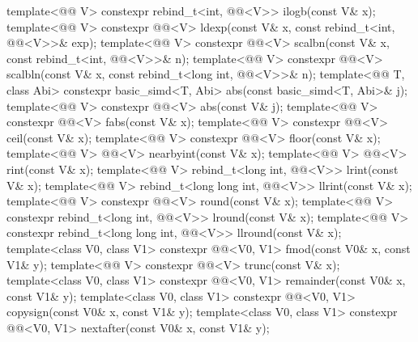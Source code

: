 \begin{itemdecl}
template<@@ V>
  constexpr rebind_t<int, @@<V>> ilogb(const V& x);
template<@@ V>
  constexpr @@<V> ldexp(const V& x, const rebind_t<int, @@<V>>& exp);
template<@@ V>
  constexpr @@<V> scalbn(const V& x, const rebind_t<int, @@<V>>& n);
template<@@ V>
  constexpr @@<V>
    scalbln(const V& x, const rebind_t<long int, @@<V>>& n);
template<@@ T, class Abi>
  constexpr basic_simd<T, Abi> abs(const basic_simd<T, Abi>& j);
template<@@ V>
  constexpr @@<V> abs(const V& j);
template<@@ V>
  constexpr @@<V> fabs(const V& x);
template<@@ V>
  constexpr @@<V> ceil(const V& x);
template<@@ V>
  constexpr @@<V> floor(const V& x);
template<@@ V>
  @@<V> nearbyint(const V& x);
template<@@ V>
  @@<V> rint(const V& x);
template<@@ V>
  rebind_t<long int, @@<V>> lrint(const V& x);
template<@@ V>
  rebind_t<long long int, @@<V>> llrint(const V& x);
template<@@ V>
  constexpr @@<V> round(const V& x);
template<@@ V>
  constexpr rebind_t<long int, @@<V>> lround(const V& x);
template<@@ V>
  constexpr rebind_t<long long int, @@<V>> llround(const V& x);
template<class V0, class V1>
  constexpr @@<V0, V1> fmod(const V0& x, const V1& y);
template<@@ V>
  constexpr @@<V> trunc(const V& x);
template<class V0, class V1>
  constexpr @@<V0, V1> remainder(const V0& x, const V1& y);
template<class V0, class V1>
  constexpr @@<V0, V1> copysign(const V0& x, const V1& y);
template<class V0, class V1>
  constexpr @@<V0, V1> nextafter(const V0& x, const V1& y);

\end{itemdecl}
